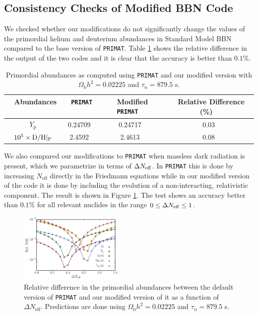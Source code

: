 \documentclass[notitlepage,letterpaper,natbib,aps,prd,onecolumn,amsmath,amsfonts,nofootinbib,preprintnumbers,superscriptaddress,secnumarabic,groupedaddress]{revtex4-1}
\begin{document}
\subsection{Consistency Checks of Modified BBN Code}\label{app:ConsistencyChecks}\vspace{-0.2cm}
We checked whether our modifications do not significantly change the values of the primordial helium and deuterium abundances in Standard Model BBN compared to the base version of \texttt{PRIMAT}. Table \ref{tab:SBBNcheck} shows the relative difference in the output of the two codes and it is clear that the accuracy is better than $0.1\%$.
\begin{table}[h]
    \centering
    {\def\arraystretch{1.35}
    \begin{tabular}{c|c|c|c}
        \toprule
      $\,\,$   \textbf{Abundances} $\,\,$ & $\,\,$ \texttt{PRIMAT}$\,\,$ & $\,\,$ \textbf{Modified} \texttt{PRIMAT} $\,\,$ & $\,\,$ \textbf{Relative Difference (\%)} $\,\,$ \\
        \hline\hline
        $Y_\mathrm{p}$ & 0.24709 & 0.24717 & 0.03\\
        $10^5\times {\rm D/H}|_{\rm P}$ & 2.4592 & 2.4613 & 0.08 \\ \hline  \hline
    \end{tabular}}\vspace{-0.1cm}
    \caption{Primordial abundances as computed using \texttt{PRIMAT} and our modified version with $\Omega_\mathrm{b} h^2 = 0.02225$ and $\tau_n = 879.5$ s.}
    \label{tab:SBBNcheck}
\end{table} 

We also compared our modifications to \texttt{PRIMAT} when massless dark radiation is present, which we parametrize in terms of $\Delta N_{\rm eff}$. In \texttt{PRIMAT} this is done by increasing $N_\mathrm{eff}$ directly in the Friedmann equations while in our modified version of the code it is done by including the evolution of a non-interacting, relativistic component. The result is shown in Figure \ref{fig:CheckDeltaNeff}.
The test shows an accuracy better than $0.1\%$ for all relevant nuclides in the range $0 \leq \Delta N_{\rm eff} \leq 1$.

\begin{figure}[t]
    \centering
    \includegraphics[width=0.45\textwidth]{figures/Neffcheck.pdf}\vspace{-0.5cm}
    \caption{Relative difference in the primordial abundances between the default version of \texttt{PRIMAT} and our modified version of it as a function of $\Delta N_{\mathrm{eff}}$. Predictions are done using $\Omega_\mathrm{b} h^2 = 0.02225$ and $\tau_n = 879.5$ s.}
    \label{fig:CheckDeltaNeff}
\end{figure}
\end{document}
